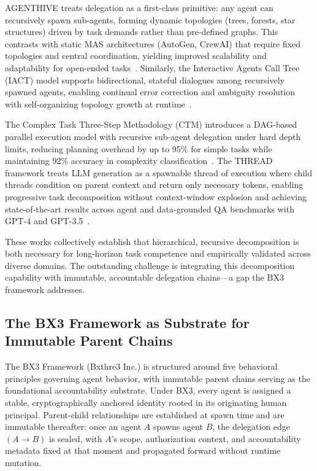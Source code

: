 AGENTHIVE treats delegation as a first-class primitive: any agent can recursively spawn sub-agents, forming dynamic topologies (trees, forests, star structures) driven by task demands rather than pre-defined graphs. This contrasts with static MAS architectures (AutoGen, CrewAI) that require fixed topologies and central coordination, yielding improved scalability and adaptability for open-ended tasks~\cite{agenthive2025}. Similarly, the Interactive Agents Call Tree (IACT) model supports bidirectional, stateful dialogues among recursively spawned agents, enabling continual error correction and ambiguity resolution with self-organizing topology growth at runtime~\cite{iact2025}.

The Complex Task Three-Step Methodology (CTM) introduces a DAG-based parallel execution model with recursive sub-agent delegation under hard depth limits, reducing planning overhead by up to 95\% for simple tasks while maintaining 92\% accuracy in complexity classification~\cite{ctm2025}. The THREAD framework treats LLM generation as a spawnable thread of execution where child threads condition on parent context and return only necessary tokens, enabling progressive task decomposition without context-window explosion and achieving state-of-the-art results across agent and data-grounded QA benchmarks with GPT-4 and GPT-3.5~\cite{thread2024}.

These works collectively establish that hierarchical, recursive decomposition is both necessary for long-horizon task competence and empirically validated across diverse domains. The outstanding challenge is integrating this decomposition capability with immutable, accountable delegation chains---a gap the BX3 framework addresses.

\subsection{The BX3 Framework as Substrate for Immutable Parent Chains}
\label{sec:bx3}

The BX3 Framework (Bxthre3 Inc.) is structured around five behavioral principles governing agent behavior, with immutable parent chains serving as the foundational accountability substrate. Under BX3, every agent is assigned a stable, cryptographically anchored identity rooted in its originating human principal. Parent-child relationships are established at spawn time and are immutable thereafter: once an agent $A$ spawns agent $B$, the delegation edge $(A \to B)$ is sealed, with $A$'s scope, authorization context, and accountability metadata fixed at that moment and propagated forward without runtime mutation.

